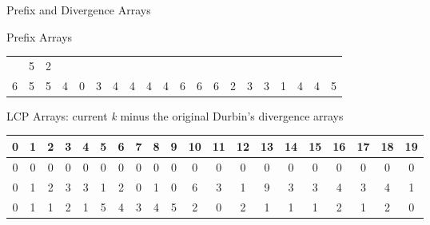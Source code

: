 \documentclass{beamer}
\begin{document}
\begin{frame}{Prefix and Divergence Arrays}
\begin{block}{Prefix Arrays}
\begin{table}[H]
\begin{tabular}{c|c|c|c|c|c|c|c|c|c|c|c|c|c|c|c|c|c|c|c}
                                                                                                                                                                                                       & 5 & 2\\
                    6 & 5 & 5 & 4 & 0 & 3 & 4 & 4 & 4 & 4 & 6 & 6 & 6 & 2 & 3 & 3 & 1 & 4
                                                                                                                                                                                                       & 4 & 5\\
                    \hline
                  \end{tabular}
                    \end{table}
                    \end{block}
                    \begin{block}{LCP Arrays: current \textit{k} minus the original Durbin's
                    divergence arrays}  
                    \begin{table}[H]
                    \tiny
                    \begin{tabular}{c|c|c|c|c|c|c|c|c|c|c|c|c|c|c|c|c|c|c|c}
                    \hline
                    0 & 1 & 2 & 3 & 4 & 5 & 6 & 7 & 8 & 9 & 10 & 11 & 12 & 13 & 14 & 15 & 16
                                                                                                                                                                                                    & 17 & 18 & 19\\
                    \hline
                    \hline
                    0 & 0 & 0 & 0 & 0 & 0 & 0 & 0 & 0 & 0 & 0 & 0 & 0 & 0 & 0 & 0 & 0 & 0
                                                                                                                                                                                                       & 0 & 0 \\
                    0 & 1 & 2 & 3 & 3 & 1 & 2 & 0 & 1 & 0 & 6 & 3 & 1 & 9 & 3 & 3 & 4 & 3
                                                                                                                                                                                                       & 4 & 1 \\
                    0 & 1 & 1 & 2 & 1 & 5 & 4 & 3 & 4 & 5 & 2 & 0 & 2 & 1 & 1 & 1 & 2 & 1
                                                                                                                                                                                                       & 2 & 0 \\

\end{tabular}
\end{table}
\end{block}
\end{frame}
\end{document}
